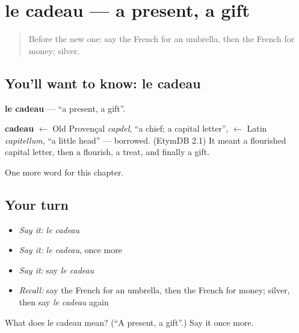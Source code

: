 \section[le cadeau]{le cadeau — a present, a gift}

\label{lesson:FR-C79-cadeau}



\begin{quote}
Before the new one: say the French for an umbrella, then the French for money; silver.
\end{quote}

\subsection*{You'll want to know: le cadeau}
\textbf{le cadeau} — \textquotedblleft{}a present, a gift\textquotedblright{}.

\begin{cousinweb}
\textbf{cadeau} $\leftarrow$ Old Provençal \emph{capdel}, \textquotedblleft{}a chief; a capital letter\textquotedblright{}, $\leftarrow$ Latin \emph{capitellum}, \textquotedblleft{}a little head\textquotedblright{} — borrowed. (EtymDB 2.1) It meant a flourished capital letter, then a flourish, a treat, and finally a gift.
\end{cousinweb}

\begin{grammarlens}[title={What you've built}]
One more word for this chapter.
\end{grammarlens}

\subsection*{Your turn}
\begin{itemize}
\raggedright
  \item \emph{Say it:} \emph{le cadeau}
  \item \emph{Say it:} \emph{le cadeau}, once more
  \item \emph{Say it:} say \emph{le cadeau}
  \item \emph{Recall:} say the French for an umbrella, then the French for money; silver, then say \emph{le cadeau} again
\end{itemize}

\begin{tcolorbox}[breakable,colback=teal!4,colframe=teal!35!black,title={Before you move on}]
What does le cadeau mean? (\textquotedblleft{}A present, a gift\textquotedblright{}.) Say it once more.
\end{tcolorbox}
